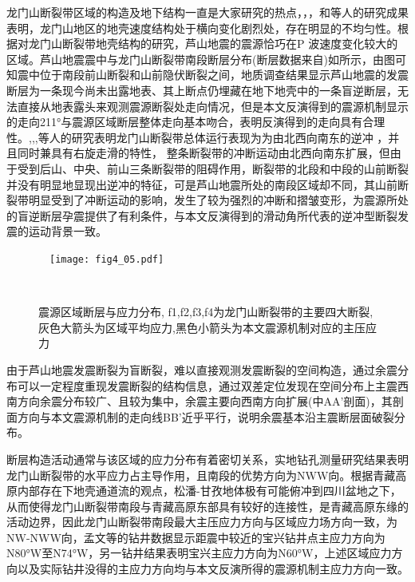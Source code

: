 龙门山断裂带区域的构造及地下结构一直是大家研究的热点，\citet{Zhang2013}，\citet{Wang2010}，和\citet{Zhang2011}等人的研究成果表明，龙门山地区的地壳速度结构处于横向变化剧烈处，存在明显的不均匀性。根据对龙门山断裂带地壳结构的研究，芦山地震的震源恰巧在P 波速度变化较大的区域。芦山地震震中与龙门山断裂带南段断层分布(断层数据来自)如所示，由图可知震中位于南段前山断裂和山前隐伏断裂之间，地质调查结果显示芦山地震的发震断层为一条现今尚未出露地表、其上断点仍埋藏在地下地壳中的一条盲逆断层，无法直接从地表露头来观测震源断裂处走向情况，但是本文反演得到的震源机制显示的走向211°与震源区域断层整体走向基本吻合，表明反演得到的走向具有合理性。,,\citet{Densmore2007},等人的研究表明龙门山断裂带总体运行表现为为由北西向南东的逆冲 ，并且同时兼具有右旋走滑的特性， 整条断裂带的冲断运动由北西向南东扩展，但由于受到后山、中央、前山三条断裂带的阻碍作用，断裂带的北段和中段的山前断裂并没有明显地显现出逆冲的特征，可是芦山地震所处的南段区域却不同，其山前断裂带明显受到了冲断运动的影响，发生了较为强烈的冲断和摺皱变形，为震源所处的盲逆断层孕震提供了有利条件，与本文反演得到的滑动角所代表的逆冲型断裂发震的运动背景一致。
\begin{figure}
\centering
  \texttt{[image: fig4\_05.pdf]}
  \caption{ 震源区域断层与应力分布, f1,f2,f3,f4为龙门山断裂带的主要四大断裂,灰色大箭头为区域平均应力,黑色小箭头为本文震源机制对应的主压应力}
  \label{fig4_05}
\end{figure}

由于芦山地震发震断裂为盲断裂，难以直接观测发震断裂的空间构造，通过余震分布可以一定程度重现发震断裂的结构信息，\citet{zhangguangwei2013}通过双差定位发现在空间分布上主震西南方向余震分布较广、且较为集中，余震主要向西南方向扩展(中AA'剖面)，其剖面方向与本文震源机制的走向线BB'近乎平行，说明余震基本沿主震断层面破裂分布。

断层构造活动通常与该区域的应力分布有着密切关系，实地钻孔测量研究结果表明龙门山断裂带的水平应力占主导作用，且南段的优势方向为NWW向。根据青藏高原内部存在下地壳通道流的观点\citep{Royden1997,Clark2000,Meng2005,Burchfiel1995,Harris2007}，松潘-甘孜地体极有可能俯冲到四川盆地之下，从而使得龙门山断裂带南段与青藏高原东部具有较好的连接性，是青藏高原东缘的活动边界，因此龙门山断裂带南段最大主压应力方向与区域应力场方向一致，为NW-NWW向，孟文等的钻井数据显示距震中较近的宝兴钻井点主应力方向为N80°W至N74°W，另一钻井结果表明宝兴主应力方向为N60°W，上述区域应力方向以及实际钻井没得的主应力方向均与本文反演所得的震源机制主应力方向一致。


